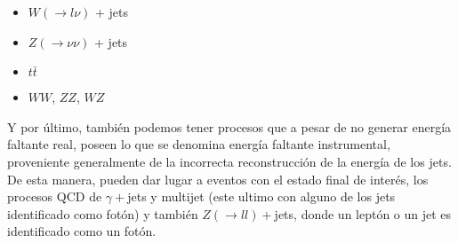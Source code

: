 \begin{itemize}
\item $W(\to l\nu)$ + jets
\item $Z(\to \nu\nu)$ + jets
\item $t\bar{t}$
\item $WW$, $ZZ$, $WZ$
\end{itemize}

Y por último, también podemos tener procesos que a pesar de no generar energía
faltante real, poseen lo que se denomina energía faltante instrumental,
proveniente generalmente de la incorrecta reconstrucción de la energía de los
jets. De esta manera, pueden dar lugar a eventos con el estado final de interés,
los procesos QCD de $\gamma+$jets y multijet (este ultimo con alguno de los jets
identificado como fotón) y también $Z(\to ll)+$jets, donde un leptón o un jet es
identificado como un fotón.






